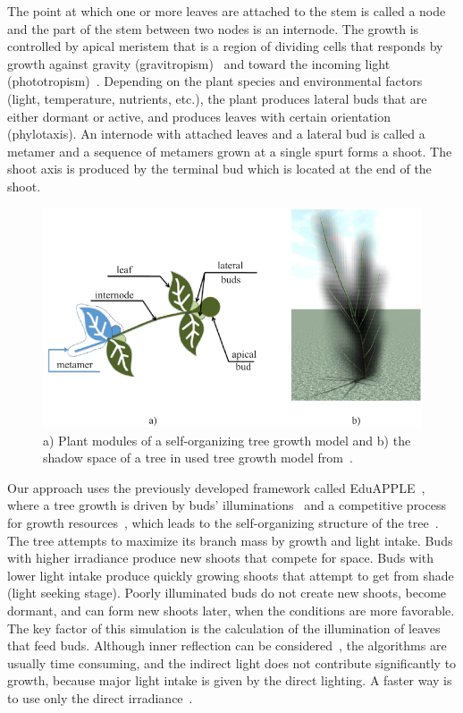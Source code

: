 The point at which one or more leaves are attached to the stem is called a node and the part of the stem between two nodes is an internode. 
The growth is controlled by apical meristem that is a region of dividing cells that responds by growth against gravity (gravitropism)~\cite{Berut201801895} and
toward the incoming light (phototropism)~\cite{mech_visual_1996}.
Depending on the plant species and environmental factors (light, temperature, nutrients, etc.), the plant produces lateral buds that are either dormant or active, and produces leaves with certain orientation (phylotaxis).
An internode with attached leaves and a lateral bud is called a metamer and a sequence of metamers grown at a single spurt forms a shoot. 
The shoot axis is produced by the terminal bud which is located at the end of the shoot.
\begin{figure}[!t]
    \centering
    \includegraphics[width=\linewidth]{figs/Fig1}
    \caption{a) Plant modules of a self-organizing tree growth
model and b) the shadow space of a tree in used tree growth model from~\cite{kohek_eduapple:_2015}.}
    \label{fig:my_figure1}
\end{figure}

Our approach uses the previously developed framework called EduAPPLE~\cite{kohek_eduapple:_2015},
where a tree growth is driven by buds' illuminations~\cite{benes_efficient_1996,benes_visual_1997,mech_visual_1996} and a competitive process for growth resources~\cite{alsweis_modeling_2005,arvo_modeling_1988,palubicki_self-organizing_2009,runions_modeling_2007}, which leads to the self-organizing structure of the tree~\cite{palubicki_self-organizing_2009}. 
The tree attempts to maximize its branch mass by growth and light intake. Buds with higher irradiance produce new shoots that compete for space. Buds with lower light intake produce quickly growing shoots
that attempt to get from shade (light seeking stage). Poorly illuminated buds do not create new shoots, become dormant, and can form new shoots later, when the conditions are more favorable. The key factor of this simulation is the calculation of the illumination of leaves that feed buds. Although inner reflection can be considered~\cite{soler_efficient_2003},
the algorithms are usually time consuming, and the indirect light does
not contribute significantly to growth, because major light intake is
given by the direct lighting. A faster way is to use only the direct
irradiance~\cite{benes_efficient_1996,benes_visual_1997,mech_visual_1996,pirk_plastic_2012}. 

